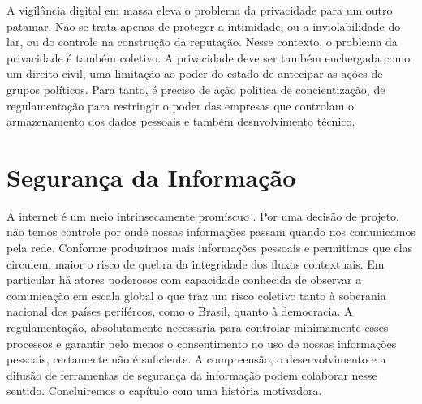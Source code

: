 A vigilância digital em massa eleva o problema da privacidade para um outro patamar.
Não se trata apenas de proteger a intimidade, ou a inviolabilidade do lar, ou do controle na construção da reputação. 
Nesse contexto, o problema da privacidade é também coletivo.
A privacidade deve ser também enchergada como um direito civil, uma limitação ao poder do estado de antecipar as ações de grupos políticos. 
Para tanto, é preciso de ação politica de concientização, de regulamentação para restringir o poder das empresas que controlam o armazenamento dos dados pessoais e também desnvolvimento técnico. 

\section{Segurança da Informação}
\label{sec:seg-inf}

A internet é um meio intrinsecamente promíscuo \cite{}.
Por uma decisão de projeto, não temos controle por onde nossas informações passam quando nos comunicamos pela rede.
Conforme produzimos mais informações pessoais e permitimos que elas circulem, maior o risco de quebra da integridade dos fluxos contextuais.
Em particular há atores poderosos com capacidade conhecida de observar a comunicação em escala global o que traz um risco coletivo tanto à soberania nacional dos países perifércos, como o Brasil, quanto à democracia.
A regulamentação, absolutamente necessaria para controlar minimamente esses processos e garantir pelo menos o consentimento no uso de nossas informações pessoais, certamente não é suficiente.
A compreensão, o desenvolvimento e a difusão de ferramentas de segurança da informação podem colaborar nesse sentido.
Concluiremos o capítulo com uma história motivadora.

